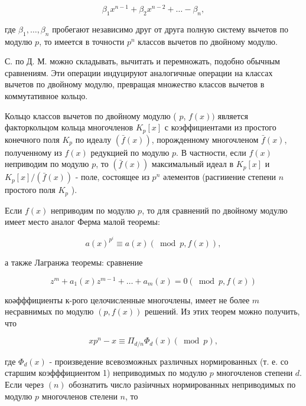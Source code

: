 \documentclass[10pt]{article}
\begin{document}
\[

\beta_{1} x^{n-1}+\beta_{2} x^{n-2}+\ldots-\beta_{n},

\]



где $\beta_{1}, \ldots, \beta_{n}$ пробегают независимо друг от друга полную систему вычетов по модулю $p$, то имеется в точности $p^{n}$ классов вычетов по двойному модулю.



С. по Д. М. можно складывать, вычитать и перемножать, подобно обычным сравнениям. Эти операции индуцируют аналогичные операции на классах вычетов по двойному модулю, превращая множество классов вычетов в коммутативное кольцо.



Кольцо классов вычетов по двойному модулю ( $p$, $f(x))$ является факторкольцом кольца многочленов $K_{p}[x]$ с коэффициентами из простого конечного поля $K_{p}$ по идеалу $(\bar{f}(x))$, порожденному многочленом $\bar{f}(x)$, полученному из $f(x)$ редукцией по модулю $p$. В частности, если $f(x)$ неприводим по модулю $p$, то $(\bar{f}(x))$ максимальный идеал в $K_{p}[x]$ и $K_{p}[x] /(\bar{f}(x))$ - поле, состоящее из $p^{n}$ әлементов (расгииение степени $n$ простого поля $K_{p}$ ).



Если $f(x)$ неприводим по модулю $p$, то для сравнений по двойному модулю имеет место аналог Ферма малой теоремы:



\[

a(x)^{p^{i}} \equiv a(x)(\bmod p, f(x)),

\]



а также Лагранжа теоремы: сравнение



\[

z^{m}+a_{1}(x) z^{m-1}+\ldots+a_{m}(x)=0(\bmod p, f(x))

\]



коәфффициенты к-рого целочисленные многочлены, имеет не более $m$ несравнимых по модулю $(p, f(x))$ решений. Из этих теорем можно получить, что



\[

x p^{n}-x \equiv \Pi_{d / n} \Phi_{d}(x)(\bmod p),

\]



где $\Phi_{d}(x)$ - произведение всевозможных различных нормированных (т. е. со старшим коэфффициентом 1) неприводимых по модулю $p$ многочленов степени $d$. Если через $(n)$ обознатить число разіичных нормированных неприводимых по модулю $p$ многочленов стелени $n$, то
\end{document}
